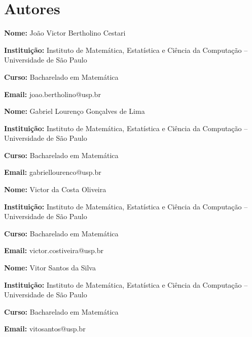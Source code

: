 \chapter*{Autores}
\thispagestyle{empty}

\vspace{1cm}

\begin{flushleft}
  \textbf{Nome:} João Victor Bertholino Cestari \par
  \textbf{Instituição:} Instituto de Matemática, Estatística e Ciência da Computação -- Universidade de São Paulo \par
  \textbf{Curso:} Bacharelado em Matemática \par
  \textbf{Email:} joao.bertholino@usp.br
\end{flushleft}

\vspace{0.5cm}

\begin{flushleft}
  \textbf{Nome:} Gabriel Lourenço Gonçalves de Lima \par
  \textbf{Instituição:} Instituto de Matemática, Estatística e Ciência da Computação -- Universidade de São Paulo \par
  \textbf{Curso:} Bacharelado em Matemática \par
  \textbf{Email:} gabriellourenco@usp.br
\end{flushleft}

\vspace{0.5cm}

\begin{flushleft}
  \textbf{Nome:} Victor da Costa Oliveira \par
  \textbf{Instituição:} Instituto de Matemática, Estatística e Ciência da Computação -- Universidade de São Paulo \par
  \textbf{Curso:} Bacharelado em Matemática \par
  \textbf{Email:} victor.costiveira@usp.br
\end{flushleft}

\vspace{0.5cm}

\begin{flushleft}
  \textbf{Nome:} Vitor Santos da Silva \par
  \textbf{Instituição:} Instituto de Matemática, Estatística e Ciência da Computação -- Universidade de São Paulo \par
  \textbf{Curso:} Bacharelado em Matemática \par
  \textbf{Email:} vitosantos@usp.br
\end{flushleft}
